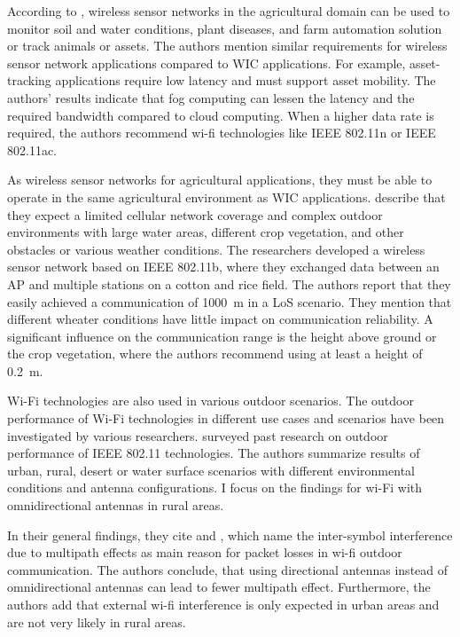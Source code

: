 According to \textcite{ahmed_internet_2018}, wireless sensor networks in the agricultural domain can be used to monitor soil and water conditions, plant diseases, and farm automation solution
or track animals or assets. The authors mention similar requirements for wireless sensor network applications compared to \ac{WIC} applications.
For example, asset-tracking applications require low latency and must support asset mobility.
The authors' results indicate that fog computing can lessen the latency and the required bandwidth compared to cloud computing.
When a higher data rate is required, the authors recommend wi-fi technologies like IEEE 802.11n or IEEE 802.11ac.

As wireless sensor networks for agricultural applications, they must be able to operate in the same agricultural environment as \ac{WIC} applications.
\textcite{brinkhoff_characterization_2017} describe that they expect a limited cellular network coverage and complex outdoor
environments with large water areas, different crop vegetation, and other obstacles or various weather conditions. The
researchers developed a wireless sensor network based on IEEE 802.11b, where they exchanged data between an \ac{AP} and multiple stations on
a cotton and rice field. The authors report that they easily achieved a communication of \SI{1000}{\metre} in a \ac{LoS} scenario.
They mention that different wheater conditions have little impact on communication reliability. A significant influence on the communication range is the height above ground or the crop vegetation, where the authors recommend using at least a height of \SI{0.2}{\metre}.


Wi-Fi technologies are also used in various outdoor scenarios.
The outdoor performance of Wi-Fi technologies in different use cases and scenarios have been investigated by various researchers.
\textcite{aust_outdoor_2015} surveyed past research on outdoor performance of IEEE 802.11 technologies. The authors summarize results of
urban, rural, desert or water surface scenarios with different environmental conditions and antenna configurations. I focus on the
findings for wi-Fi with omnidirectional antennas in rural areas.

In their general findings, they cite \cite{sheth_packet_2007} and \cite{aguayo_link-level_2004}, which name the inter-symbol
interference due to multipath effects as main reason for packet losses in wi-fi outdoor communication. The authors conclude,
that using directional antennas instead of omnidirectional antennas can lead to fewer multipath effect. Furthermore, the authors add
that external wi-fi interference is only expected in urban areas and are not very likely in rural areas.

